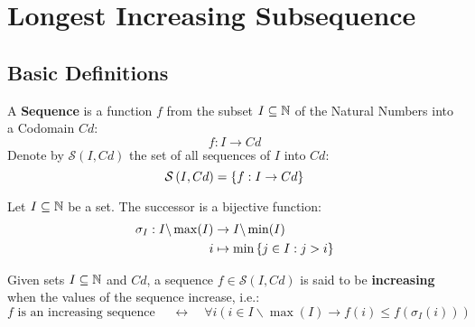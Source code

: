 \newcommand{\SetDiff}[2]{#1 \backslash #2}

\newcommand{\sequence}[2]{\ensuremath{\mathcal{S}\left( #1, #2 \right)}}
\newcommand{\subsequenceSet}[1]{\ensuremath{\mathfrak{s}\left(#1\right)}}
\newcommand{\subsequenceOf}[2]{\ensuremath{#1 \preceq #2}}
\newcommand{\subsequenceDomain}[1]{\ensuremath{\mathfrak{d}\left(#1\right)}}
\newcommand{\successorF}[1]{\ensuremath{\sigma_{#1}}}
\newcommand{\successor}[2]{\ensuremath{\successorF{#2}\left( #1 \right)}}
\newcommand{\length}[1]{\ensuremath{\mathfrak{L}\left(#1\right)}}
\newcommand{\increasingSubsequence}[1]{\ensuremath{\mathcal{I}\left(#1\right)}}
\newcommand{\ArgMax}[2]{\argmax\limits_{#1} \ #2}

\chapter{Longest Increasing Subsequence}

\section{Basic Definitions}

\begin{defn}[Sequence]
    A \textbf{Sequence} is a function $f$ from the subset $I \subseteq \mathbb{N}$ of the Natural Numbers into a Codomain $Cd$:
    \begin{equation}
        f: I \rightarrow Cd
    \end{equation}
    Denote by $\sequence{I}{Cd}$ the set of all sequences of $I$ into $Cd$:
    \begin{equation}
        \sequence{I}{Cd} = \Set{f: I \rightarrow Cd}
    \end{equation}
\end{defn}

\begin{defn}[Successor]
    Let $I \subseteq \mathbb{N}$ be a set. The successor is a bijective function:
    \begin{align}
        \successorF{I}: \SetDiff{I}{\max(I)} & \rightarrow \SetDiff{I}{\min(I)} \\
        i & \mapsto \min\SetOf{j \in I}{j > i}
    \end{align}
\end{defn}

\begin{defn}
    Given sets $I \subseteq \mathbb{N}$ and $Cd$, a sequence $f \in \sequence{I}{Cd}$ is said to be \textbf{increasing} when the values of the sequence increase, i.e.:
    \begin{equation}
        \mbox{$f$ is an increasing sequence }
        \quad \leftrightarrow \quad
        \forall i \left(
            i \in \SetDiff{I}{\max(I)}
            \rightarrow
            f(i) \leqslant f(\successor{i}{I})
        \right)
    \end{equation}
\end{defn}

